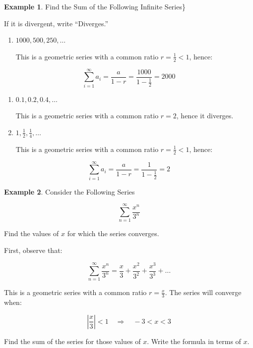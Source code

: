 \documentclass[
]{book}
\theoremstyle{definition}
\theoremstyle{definition}
\newtheorem{example}{Example}[chapter]
\theoremstyle{definition}
\theoremstyle{definition}
\theoremstyle{remark}
\begin{document}
\begin{example}
\protect\hypertarget{exm:unnamed-chunk-47}{}\label{exm:unnamed-chunk-47}Find the Sum of the Following Infinite Series\}

If it is divergent, write ``Diverges.''

\begin{enumerate}
\def\labelenumi{\alph{enumi}.}
\item
  \(1000, 500, 250, \dots\)

  This is a geometric series with a common ratio \(r = \frac{1}{2} < 1\), hence:
\end{enumerate}

\[
    \sum_{i=1}^\infty a_i = \frac{a}{1-r} = \frac{1000}{1 - \frac{1}{2}} = 2000
    \]

\begin{enumerate}
\def\labelenumi{\alph{enumi}.}
\setcounter{enumi}{1}
\item
  \(0.1, 0.2, 0.4, \dots\)

  This is a geometric series with a common ratio \(r = 2\), hence it diverges.
\item
  \(1, \frac{1}{2}, \frac{1}{4}, \dots\)

  This is a geometric series with a common ratio \(r = \frac{1}{2} < 1\), hence:
\end{enumerate}

\[
    \sum_{i=1}^\infty a_i = \frac{a}{1-r} = \frac{1}{1 - \frac{1}{2}} = 2
    \]
\end{example}

\begin{example}
\protect\hypertarget{exm:unnamed-chunk-48}{}\label{exm:unnamed-chunk-48}Consider the Following Series

\[
\sum_{n=1}^\infty \frac{x^n}{3^n}
\]
\end{example}

Find the values of \(x\) for which the series converges.

First, observe that:

\[
    \sum_{n=1}^\infty \frac{x^n}{3^n} = \frac{x}{3} + \frac{x^2}{3^2} + \frac{x^3}{3^3} + \dots
    \]

This is a geometric series with a common ratio \(r = \frac{x}{3}\). The series will converge when:

\[
    \left|\frac{x}{3}\right| < 1 \quad \Rightarrow \quad -3 < x < 3
    \]

Find the sum of the series for those values of \(x\). Write the formula in terms of \(x\).
\end{document}
